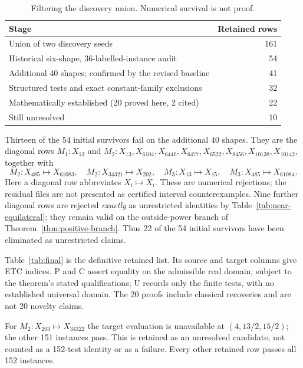 \documentclass[11pt]{article}
\begin{document}
\begin{table}[ht]
\centering
\caption{Filtering the discovery union. Numerical survival is not proof.}
\label{tab:stages}
\begin{tabular}{@{}lr@{}}
\toprule Stage & Retained rows\\\midrule
Union of two discovery seeds & 161\\
Historical six-shape, 36-labelled-instance audit & 54\\
Additional 40 shapes; confirmed by the revised baseline & 41\\
Structured tests and exact constant-family exclusions & 32\\
\quad Mathematically established (20 proved here, 2 cited) & 22\\
\quad Still unresolved & 10\\\bottomrule
\end{tabular}
\end{table}

Thirteen of the 54 initial survivors fail on the additional 40 shapes.
They are the diagonal rows $M_1:X_{13}$ and
$M_2:X_{13},X_{6104},X_{6440},X_{6477},X_{6522},X_{8456},
X_{10138},X_{10142}$, together with
\[
 M_2:X_{485}\mapsto X_{61083},\quad
 M_2:X_{34321}\mapsto X_{202},\quad
 M_3:X_{13}\mapsto X_{15},\quad
 M_3:X_{485}\mapsto X_{61084}.
\]
Here a diagonal row abbreviates $X_i\mapsto X_i$.
These are numerical rejections; the residual files are not presented as
certified interval counterexamples.  Nine further diagonal rows are
rejected \emph{exactly} as unrestricted identities by
Table~\ref{tab:near-equilateral}; they remain valid on the outside-power
branch of Theorem~\ref{thm:positive-branch}.  Thus 22 of the 54 initial
survivors have been eliminated as unrestricted claims.

Table~\ref{tab:final} is the definitive retained list.  Its source and
target columns give ETC indices.  P and C assert equality on the admissible
real domain, subject to the theorem's stated qualifications; U records
only the finite tests, with no established universal domain.  The 20
proofs include classical recoveries and are not 20 novelty claims.

{\small

}

For $M_2:X_{203}\mapsto X_{34322}$ the target evaluation is unavailable
at $(4,13/2,15/2)$; the other 151 instances pass.  This is retained as an
unresolved candidate, not counted as a 152-test identity or as a failure.
Every other retained row passes all 152 instances.
\end{document}
